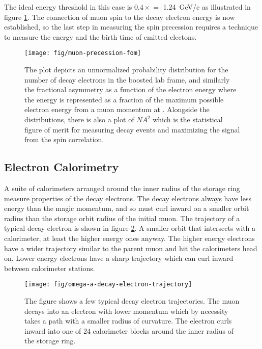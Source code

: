 \noindent
The ideal energy threshold in this case is $0.4\times$\pmagic$ = $ \SI{1.24}{\GeV/c} as illustrated in figure \ref{fig:muon-precession-fom}.  The connection of muon spin to the decay electron energy is now established, so the last step in measuring the spin precession requires a technique to measure the energy and the birth time of emitted electons. \cite{e821-prd}

\begin{figure}
\centering
\texttt{[image: fig/muon-precession-fom]}
\caption{The plot depicts an unnormalized probability distribution for the number of decay electrons in the boosted lab frame, and similarly the fractional asymmetry as a function of the electron energy where the energy is represented as a fraction of the maximum possible electron energy from a muon momentum at \pmagic. Alongside the distributions, there is also a plot of $NA^2$ which is the statistical figure of merit for measuring decay events and maximizing the signal from the spin correlation. \label{fig:muon-precession-fom}}
\end{figure}

\subsection{Electron Calorimetry}

A suite of calorimeters arranged around the inner radius of the storage ring measure properties of the decay electrons.  The decay electrons always have less energy than the magic momentum, and so must curl inward on a smaller orbit radius than the storage orbit radius of the initial muon.  The trajectory of a typical decay electron is shown in figure \ref{fig:omega-a-decay-electron-trajectory}.  A smaller orbit that intersects with a calorimeter, at least the higher energy ones anyway. The higher energy electrons have a wider trajectory similar to the parent muon and hit the calorimeters head on.  Lower energy electrons have a sharp trajectory which can curl inward between calorimeter stations.

\begin{figure}
\texttt{[image: fig/omega-a-decay-electron-trajectory]}
\caption{The figure shows a few typical decay electron trajectories.  The muon decays into an electron with lower momentum which by necessity takes a path with a smaller radius of curvature.  The electron curls inward into one of 24 calorimeter blocks around the inner radius of the storage ring. \label{fig:omega-a-decay-electron-trajectory}}
\end{figure}

